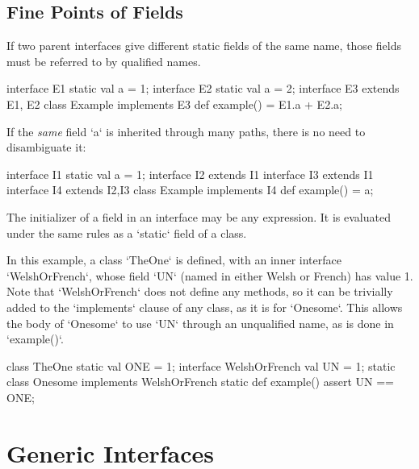 \subsection{Fine Points of Fields}

If two parent interfaces give different static fields of the same name, 
those fields must be referred to by qualified names.
% 
\begin{xten}
interface E1 {static val a = 1;}
interface E2 {static val a = 2;}
interface E3 extends E1, E2{}
class Example implements E3 {
  def example() = E1.a + E2.a;
}
\end{xten}
%

If the {\em same} field \xcd`a` is inherited through many paths, there is no need to
disambiguate it:
\begin{xten}
interface I1 { static val a = 1;} 
interface I2 extends I1 {}
interface I3 extends I1 {}
interface I4 extends I2,I3 {}
class Example implements I4 {
  def example() = a;
}
\end{xten}
%

The initializer of a field in an interface may be any expression.  It is
evaluated under the same rules as a \xcd`static` field of a class. 

\begin{ex}
In this example, a class \xcd`TheOne` is defined,
with an inner interface \xcd`WelshOrFrench`, whose field \xcd`UN` (named in
either Welsh or French) has value 1.  Note that \xcd`WelshOrFrench` does not
define any methods, so it can be trivially added to the \xcd`implements`
clause of any class, as it is for \xcd`Onesome`. 
This allows the body of \xcd`Onesome` to use \xcd`UN` through an unqualified
name, as is done in \xcd`example()`.

\begin{xten}
class TheOne {
  static val ONE = 1;
  interface WelshOrFrench {
    val UN = 1;
  }
  static class Onesome implements WelshOrFrench {
    static def example() {
      assert UN == ONE;
    }
  }
}
\end{xten}
\end{ex}

\section{Generic Interfaces}

